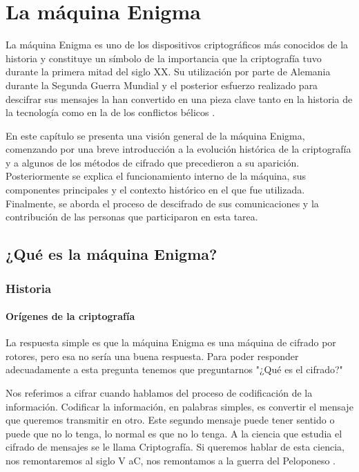 \chapter {La máquina Enigma}
\label{cap:maquina_enigma}

La máquina Enigma es uno de los dispositivos criptográficos más conocidos de la historia y constituye un símbolo de la importancia que la criptografía tuvo durante la primera mitad del siglo XX. Su utilización por parte de Alemania durante la Segunda Guerra Mundial y el posterior esfuerzo realizado para descifrar sus mensajes la han convertido en una pieza clave tanto en la historia de la tecnología como en la de los conflictos bélicos \cite{cryptomuseum_enigma}.

En este capítulo se presenta una visión general de la máquina Enigma, comenzando por una breve introducción a la evolución histórica de la criptografía y a algunos de los métodos de cifrado que precedieron a su aparición. Posteriormente se explica el funcionamiento interno de la máquina, sus componentes principales y el contexto histórico en el que fue utilizada. Finalmente, se aborda el proceso de descifrado de sus comunicaciones y la contribución de las personas que participaron en esta tarea.

\section {¿Qué es la máquina Enigma?}

\subsection {Historia}
\subsubsection {Orígenes de la criptografía}

La respuesta simple es que la máquina Enigma es una máquina de cifrado por rotores, pero esa no sería una buena respuesta. Para poder responder adecuadamente a esta pregunta tenemos que preguntarnos "¿Qué es el cifrado?"

Nos referimos a cifrar cuando hablamos del proceso de codificación de la información. Codificar la información, en palabras simples, es convertir el mensaje que queremos transmitir en otro. Este segundo mensaje puede tener sentido o puede que no lo tenga, lo normal es que no lo tenga. A la ciencia que estudia el cifrado de mensajes se le llama Criptografía. Si queremos hablar de esta ciencia, nos remontaremos al siglo V aC, nos remontamos a la guerra del Peloponeso \cite{muy_interesante_encriptar}.

